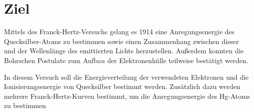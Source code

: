 \section{Ziel}
\label{sec:Ziel}

Mittels des Franck-Hertz-Versuchs gelang es 1914 eine Anregungsenergie des Quecksilber-Atoms zu bestimmen sowie einen Zusammenhang zwischen 
dieser und der Wellenlänge des emittierten Lichts herzustellen. Außerdem konnten die Bohrschen Postulate zum Aufbau der Elektronenhülle teilweise bestätigt 
werden. 

In diesem Versuch soll die Energieverteilung der verwendeten Elektronen und die Ionisierungsenergie von Quecksilber bestimmt werden. Zusätzlich 
dazu werden mehrere Franck-Hertz-Kurven bestimmt, um die Anregungsenergie des Hg-Atoms zu bestimmen